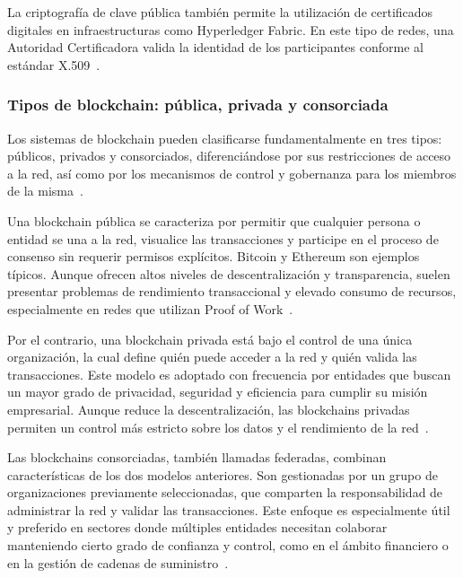La criptografía de clave pública también permite la utilización de certificados digitales en infraestructuras como Hyperledger Fabric. En este tipo de redes, una Autoridad Certificadora valida la identidad de los participantes conforme al estándar X.509~\cite{HyperledgerFabric2.5Identity}.

\subsubsection{Tipos de blockchain: pública, privada y consorciada}
Los sistemas de blockchain pueden clasificarse fundamentalmente en tres tipos: públicos, privados y consorciados, diferenciándose por sus restricciones de acceso a la red, así como por los mecanismos de control y gobernanza para los miembros de la misma~\cite{Tapscott2016}.

Una blockchain pública se caracteriza por permitir que cualquier persona o entidad se una a la red, visualice las transacciones y participe en el proceso de consenso sin requerir permisos explícitos. Bitcoin y Ethereum son ejemplos típicos. Aunque ofrecen altos niveles de descentralización y transparencia, suelen presentar problemas de rendimiento transaccional y elevado consumo de recursos, especialmente en redes que utilizan Proof of Work~\cite{Antonopoulos2017}.

Por el contrario, una blockchain privada está bajo el control de una única organización, la cual define quién puede acceder a la red y quién valida las transacciones. Este modelo es adoptado con frecuencia por entidades que buscan un mayor grado de privacidad, seguridad y eficiencia para cumplir su misión empresarial. Aunque reduce la descentralización, las blockchains privadas permiten un control más estricto sobre los datos y el rendimiento de la red~\cite{Lee2011}.

Las blockchains consorciadas, también llamadas federadas, combinan características de los dos modelos anteriores. Son gestionadas por un grupo de organizaciones previamente seleccionadas, que comparten la responsabilidad de administrar la red y validar las transacciones. Este enfoque es especialmente útil y preferido en sectores donde múltiples entidades necesitan colaborar manteniendo cierto grado de confianza y control, como en el ámbito financiero o en la gestión de cadenas de suministro~\cite{Wood2014}.

